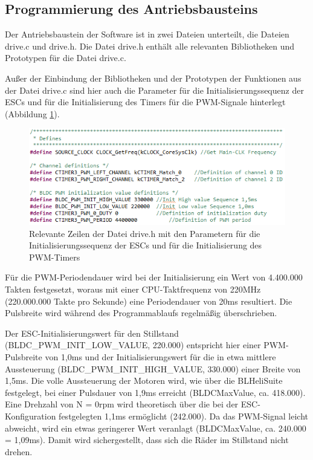 \subsection{Programmierung des Antriebsbausteins}\label{Sec4Sub4}

Der Antriebsbaustein der Software ist in zwei Dateien unterteilt, die Dateien \glqq{}drive.c\grqq{} und \glqq{}drive.h\grqq{}. Die Datei \glqq{}drive.h\grqq{} enthält alle relevanten Bibliotheken und Prototypen für die Datei \glqq{}drive.c\grqq{}.\vspace{11pt}

Außer der Einbindung der Bibliotheken und der Prototypen der Funktionen aus der Datei \glqq{}drive.c\grqq{} sind hier auch die Parameter für die Initialisierungssequenz der \ac{ESC}s und für die Initialisierung des Timers für die \ac{PWM}-Signale hinterlegt (Abbildung \ref{fig:DriveH}). 

\begin{figure}[H] %
\includegraphics[width=.85\textwidth]{sec4/images/DriveH} 
\centering
\captionsetup{width=.95\textwidth}
\caption[Relevante Zeilen der Datei \glqq{}drive.h\grqq{}]{Relevante Zeilen der Datei \glqq{}drive.h\grqq{} mit den Parametern für die Initialisierungssequenz der \ac{ESC}s und für die Initialisierung des \ac{PWM}-Timers}\centering
\label{fig:DriveH}
\end{figure}

Für die \ac{PWM}-Periodendauer wird bei der Initialisierung ein Wert von 4.400.000 Takten festgesetzt, woraus mit einer \ac{CPU}-Taktfrequenz von 220MHz (220.000.000 Takte pro Sekunde) eine Periodendauer von 20ms resultiert. Die Pulsbreite wird während des Programmablaufs regelmäßig überschrieben.\vspace{11pt}

Der \ac{ESC}-Initialisierungswert für den Stillstand (\glqq{}BLDC\_PWM\_INIT\_LOW\_VALUE\grqq{}, 220.000) entspricht hier einer \ac{PWM}-Pulsbreite von 1,0ms und der Initialisierungswert für die in etwa mittlere Aussteuerung (\glqq{}BLDC\_PWM\_INIT\_HIGH\_VALUE\grqq{}, 330.000) einer Breite von 1,5ms. Die volle Aussteuerung der Motoren wird, wie über die \glqq{}BLHeliSuite\grqq{} festgelegt, bei einer Pulsdauer von 1,9ms erreicht (BLDCMaxValue, ca. 418.000). Eine Drehzahl von N = 0rpm wird theoretisch über die bei der \ac{ESC}-Konfiguration festgelegten 1,1ms ermöglicht (242.000). Da das \ac{PWM}-Signal leicht abweicht, wird ein etwas geringerer Wert veranlagt (BLDCMaxValue, ca. 240.000 = 1,09ms). Damit wird sichergestellt, dass sich die Räder im Stillstand nicht drehen.\vspace{11pt}

